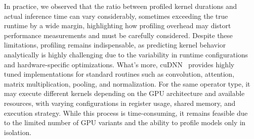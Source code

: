 In practice, we observed that the ratio between profiled kernel durations and actual inference time can vary considerably, sometimes exceeding the true runtime by a wide margin, highlighting how profiling overhead may distort performance measurements and must be carefully considered.
Despite these limitations, profiling remains indispensable, as predicting kernel behavior analytically is highly challenging due to the variability in runtime configurations and hardware-specific optimizations. What's more, cuDNN~\cite{cudnn} provides highly tuned implementations for standard routines such as convolution, attention, matrix multiplication, pooling, and normalization. For the same operator type, it may execute different kernels depending on the GPU architecture and available resources, with varying configurations in register usage, shared memory, and execution strategy. While this process is time-consuming, it remains feasible due to the limited number of GPU variants and the ability to profile models only in isolation.

